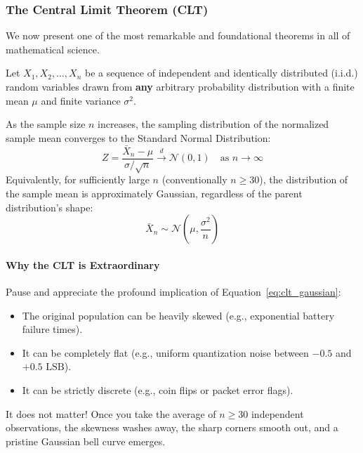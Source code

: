 \subsubsection{The Central Limit Theorem (CLT)}
We now present one of the most remarkable and foundational theorems in all of mathematical science.

\begin{keyidea}
Let $X_1, X_2, \dots, X_n$ be a sequence of independent and identically distributed (i.i.d.) random variables drawn from \textbf{any} arbitrary probability distribution with a finite mean $\mu$ and finite variance $\sigma^2$. 

As the sample size $n$ increases, the sampling distribution of the normalized sample mean converges to the Standard Normal Distribution:
\begin{equation}
Z = \frac{\bar{X}_n - \mu}{\sigma / \sqrt{n}} \xrightarrow{d} \mathcal{N}(0, 1) \quad \text{as } n \to \infty\label{eq:clt_formal}
\end{equation}
Equivalently, for sufficiently large $n$ (conventionally $n \ge 30$), the distribution of the sample mean is approximately Gaussian, regardless of the parent distribution's shape:
\begin{equation}
\bar{X}_n \sim \mathcal{N}\left( \mu, \frac{\sigma^2}{n} \right)\label{eq:clt_gaussian}
\end{equation}
\end{keyidea}

\paragraph{Why the CLT is Extraordinary}
Pause and appreciate the profound implication of Equation~\eqref{eq:clt_gaussian}:
\begin{itemize}
    \item The original population can be heavily skewed (e.g., exponential battery failure times).
    \item It can be completely flat (e.g., uniform quantization noise between $-0.5$ and $+0.5\text{ LSB}$).
    \item It can be strictly discrete (e.g., coin flips or packet error flags).
\end{itemize}
It does not matter! Once you take the average of $n \ge 30$ independent observations, the skewness washes away, the sharp corners smooth out, and a pristine Gaussian bell curve emerges.

